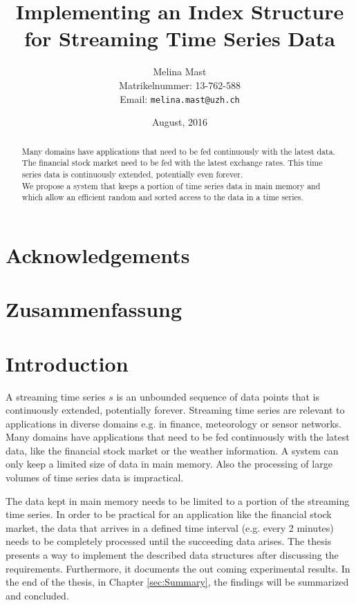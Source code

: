 \documentclass[abstracton,12pt]{scrreprt}
\title{Implementing an Index Structure for Streaming Time Series Data}
\author{
  Melina Mast\\[-5pt]
  \scriptsize Matrikelnummer: 13-762-588\\[-5pt]
  \scriptsize Email: \texttt{melina.mast@uzh.ch}
}
\date{\vspace*{2cm}August, 2016}
\begin{document}
\maketitle

\chapter*{Acknowledgements}



\begin{abstract}
Many domains have applications that need to be fed continuously with the latest data. The financial stock market need to be fed with the latest exchange rates. This time series data is continuously extended, potentially even forever.\\
We propose a system that keeps a portion of time series data in main memory and which allow an efficient random and sorted access to the data in a time series. 
\end{abstract}

\chapter*{Zusammenfassung}

\tableofcontents
\listoffigures
\listoftables
\listofalgorithms
\renewcommand{\lstlistingname}{Algorithm}%



\chapter{Introduction}
A streaming time series $s$ is an unbounded sequence of data points that is continuously extended, potentially forever. Streaming time series are relevant to applications in diverse domains e.g. in finance, meteorology or sensor networks. Many domains have applications that need to be fed continuously with the latest data, like the financial stock market or the weather information. A system can only keep a limited size of data in main memory. Also the processing of large volumes of time series data is impractical.

The data kept in main memory needs to be limited to a portion of the streaming time series. In order to be practical for an application like the financial stock market, the data that arrives in a defined time interval (e.g. every 2 minutes) needs to be completely processed until the succeeding data arises.
The thesis presents a way to implement the described data structures after discussing the requirements. Furthermore, it documents the out coming experimental results.
In the end of the thesis, in Chapter \ref{sec:Summary}, the findings will be summarized and concluded.
\end{document}
